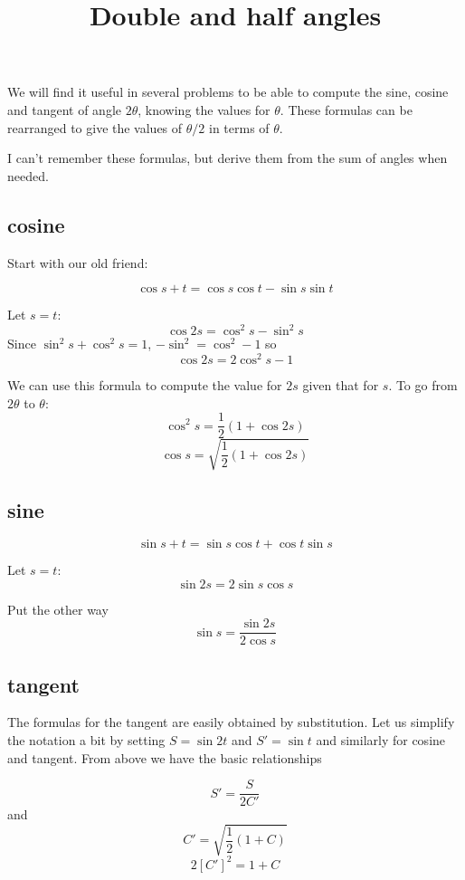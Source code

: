 \documentclass[11pt, oneside]{article}
\title{Double and half angles}
\date{}
\begin{document}
\maketitle
\Large


\label{sec:double_half_angles}

We will find it useful in several problems to be able to compute the sine, cosine and tangent of angle $2\theta$, knowing the values for $\theta$.  These formulas can be rearranged to give the values of $\theta/2$ in terms of $\theta$.

I can't remember these formulas, but derive them from the sum of angles when needed.

\subsection*{cosine}

Start with our old friend:

\[ \cos s + t = \cos s \cos t - \sin s \sin t \]

Let $s=t$:
\[ \cos 2s = \cos^2 s - \sin^2 s \]
Since $\sin^2 s + \cos^2 s = 1$, $-\sin^2 = \cos^2 - 1$ so
\[  \cos 2s = 2 \cos^2 s - 1 \]

We can use this formula to compute the value for $2s$ given that for $s$.  To go from $2\theta$ to $\theta$:
\[ \cos^2 s = \frac{1}{2}(1 + \cos 2s) \]
\[ \cos s = \sqrt{ \frac{1}{2}(1 + \cos 2s)} \]

\subsection*{sine}
\[ \sin s + t = \sin s \cos t + \cos t \sin s \]

Let $s = t$:
\[ \sin 2s = 2 \sin s \cos s \]

Put the other way
\[ \sin s = \frac{\sin 2s}{2 \cos s} \]

\subsection*{tangent}

The formulas for the tangent are easily obtained by substitution.  Let us simplify the notation a bit by setting $S = \sin 2t$ and $S' = \sin t$ and similarly for cosine and tangent.  From above we have the basic relationships

\[ S' = \frac{S}{2 C'} \]
and
\[ C' = \sqrt{\frac{1}{2} (1 + C)}  \]
\[ 2[C']^2 = 1 + C \]
\end{document}

